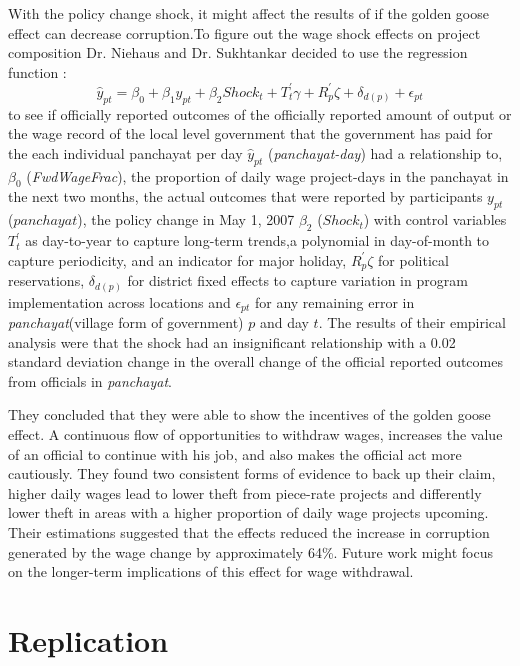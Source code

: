 \documentclass[12pt]{article}
\begin{document}
With the policy change shock, it might affect the results of if the golden goose effect can decrease corruption.To figure out the wage shock effects on project composition Dr. Niehaus and Dr. Sukhtankar decided to use the regression function :$$\hat{y}_{pt}= \beta_0 + \beta_1 y_{pt} + \beta_2Shock_t + T^{'}_t\gamma + R^{'}_p\zeta  + \delta_{d(p)}+  \epsilon_{pt}$$ to see if officially reported outcomes of the officially reported amount of output or the wage record of the local level government that the government has paid for the each
individual panchayat per day $\hat{y}_{pt}$ (\emph{panchayat-day}) had a relationship to, $\beta_0$ (\emph{FwdWageFrac}), the proportion of daily wage project-days in the panchayat in the next two months, the actual outcomes that were reported by participants $y_{pt}$ ($panchayat$), the policy change in May 1, 2007 $\beta_2$ ($Shock_t$) with control variables $T^{'}_t$ as day-to-year to capture long-term trends,a polynomial in day-of-month to capture periodicity, and an indicator for major holiday, $R^{'}_p\zeta$ for political reservations, $\delta_{d(p)}$ for district fixed effects to capture variation in program implementation across locations and $\epsilon_{pt}$ for any remaining error in \emph{panchayat}(village form of government) $p$ and day $t$. The results of their empirical analysis were that the shock had an insignificant relationship with a 0.02 standard deviation change in the overall change of the official reported outcomes from officials in \emph{panchayat}.


They concluded that they were able to show the incentives of the golden goose effect. A continuous flow of opportunities to withdraw wages, increases the value of an official to continue with his job, and also makes the official act more cautiously. They found two consistent forms of evidence to back up their claim, higher daily wages lead to lower theft from piece-rate projects and differently lower theft in areas with a higher proportion of daily wage projects upcoming. Their estimations suggested that the effects reduced the increase in corruption generated by the wage change by approximately 64\%. Future work might focus on the longer-term implications of this effect for wage withdrawal.




\section{Replication}
\end{document}
